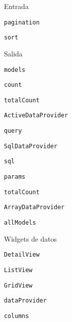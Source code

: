 \begin{longenum}
\begin{longenum}
        \begin{longenum}
            \item Entrada
            \begin{longenum}
                \item \texttt{pagination}
                \item \texttt{sort}
            \end{longenum}
            \item Salida
            \begin{longenum}
                \item \texttt{models}
                \item \texttt{count}
                \item \texttt{totalCount}
            \end{longenum}
            \item \texttt{ActiveDataProvider}
            \begin{longenum}
                \item \texttt{query}
            \end{longenum}
            \item \texttt{SqlDataProvider}
            \begin{longenum}
                \item \texttt{sql}
                \item \texttt{params}
                \item \texttt{totalCount}
            \end{longenum}
            \item \texttt{ArrayDataProvider}
            \begin{longenum}
                \item \texttt{allModels}
            \end{longenum}
        \end{longenum}
        \item Widgets de datos
        \begin{longenum}
            \item \texttt{DetailView}
            \item \texttt{ListView}
            \item \texttt{GridView}
            \begin{longenum}
                \item \texttt{dataProvider}
                \item \texttt{columns}
                \begin{longenum}

\end{longenum}
\end{longenum}
\end{longenum}
\end{longenum}
\end{longenum}
